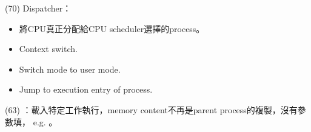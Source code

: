 \begin{theorem}{(70)} Dispatcher： \begin{itemize}
        \item 將CPU真正分配給CPU scheduler選擇的process。
        \item Context switch.
        \item Switch mode to user mode.
        \item Jump to execution entry of process.
    \end{itemize}
\end{theorem}

\begin{theorem}{(63)} ：載入特定工作執行，memory content不再是parent process的複製，沒有參數填，
    e.g. 。
\end{theorem}

